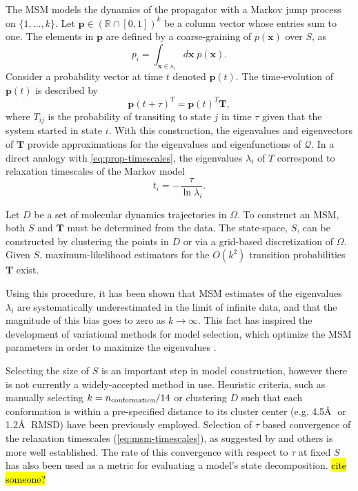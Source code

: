 \documentclass[journal=jpcbfk, layout=traditional, manuscript=article]{achemso}
\begin{document}
The MSM models the dynamics of the propagator with a Markov jump process on $\{1, \ldots, k\}$. Let $\mathbf{p} \in (\mathbb{R} \cap [0,1])^k$ be a column vector whose entries sum to one. The elements in $\mathbf{p}$ are defined by a coarse-graining of $p(\mathbf{x})$ over $S$, as
\begin{equation}
\label{eq:coarse-grain-p}
p_i = \int_{\mathbf{x} \in s_i} d\mathbf{x}\; p(\mathbf{x}).
\end{equation} 
Consider a probability vector at time $t$ denoted $\mathbf{p}(t)$. The time-evolution of $\mathbf{p}(t)$ is described by
\begin{equation}
\mathbf{p}(t+\tau)^T = \mathbf{p}(t)^T \mathbf{T},
\end{equation}
where $T_{ij}$ is the probability of transiting to state $j$ in time $\tau$ given that the system started in state $i$. With this construction, the eigenvalues and eigenvectors of $\mathbf{T}$ provide approximations for the eigenvalues and eigenfunctions of $\mathcal{Q}$. In a direct analogy with \cref{eq:prop-timescales}, the eigenvalues $\lambda_i$ of $T$ correspond to relaxation timescales of the Markov model
\begin{equation}
\label{eq:msm-timescales}
t_i = -\frac{\tau}{\ln \lambda_i}.
\end{equation}


Let $D$ be a set of molecular dynamics trajectories in $\Omega$. To construct an MSM, both $S$ and $\mathbf{T}$ must be determined from the data. The state-space, $S$, can be constructed by clustering the points in $D$ or via a grid-based discretization of $\Omega$. Given $S$, maximum-likelihood estimators for the $O(k^2)$ transition probabilities $\mathbf{T}$ exist\cite{kyle, frank}.

Using this procedure, it has been shown that MSM estimates of the eigenvalues $\lambda_i$ are systematically underestimated in the limit of infinite data, and that the magnitude of this bias goes to zero as $k\rightarrow \infty$. This fact has inspired the development of variational methods for model selection, which optimize the MSM parameters in order to maximize the eigenvalues \cite{feliks}.

Selecting the size of $S$ is an important step in model construction, however there is not currently a widely-accepted method in use. Heuristic criteria, such as manually selecting $k = n_\textnormal{conformation} / 14$ or clustering $D$ such that each conformation is within a pre-specified distance to its cluster center (e.g. 4.5\AA$\;$ or 1.2\AA $\;$ RMSD) have been previously employed\cite{Lane2012, Bowman2012, Beuchamp}. Selection of $\tau$ based convergence of the relaxation timescales (\cref{eq:msm-timescales}), as suggested by \citet{Swope2004Describing} and others is more well established. The rate of this convergence with respect to $\tau$ at fixed $S$ has also been used as a metric for evaluating a model's state decomposition. \hl{cite someone?}
\end{document}
